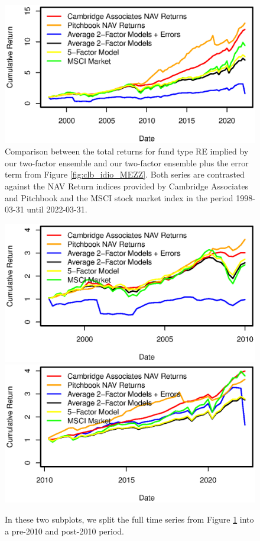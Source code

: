 \begin{figure}[H]
	\centering
	\includegraphics{Figures/XTotalErrorSeriesMEZZ}
	\caption{
		Comparison between the total returns for fund type RE implied by our two-factor ensemble and our two-factor ensemble plus the error term from Figure \ref{fig:clb_idio_MEZZ}.
		Both series are contrasted against the NAV Return indices provided by Cambridge Associates and Pitchbook and the MSCI stock market index in the period 1998-03-31 until 2022-03-31.
	}
	\label{fig:clb_total_MEZZ}
\end{figure}

\begin{figure}[H]
	\centering
	\includegraphics{Figures/XTotalErrorSeriesMEZZpre2010}
	\includegraphics{Figures/XTotalErrorSeriesMEZZpost2010}
	\caption{
		In these two subplots, we split the full time series from Figure \ref{fig:clb_total_MEZZ} into a pre-2010 and post-2010 period.
	}
	\label{fig:clb_pre_post_2010_MEZZ}
\end{figure}


